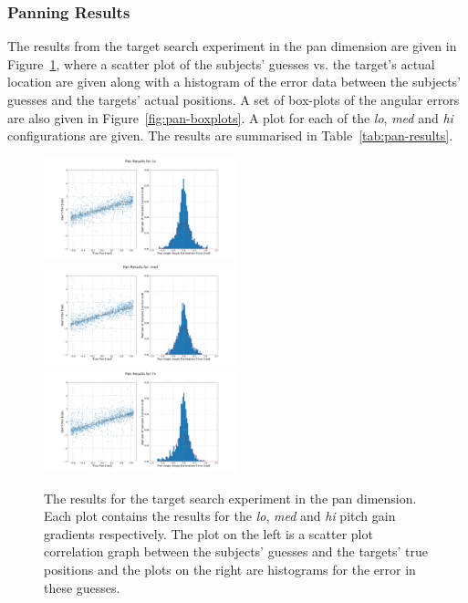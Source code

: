 \documentclass[format=sigconf, review=true, screen=true, anonymous=true]{acmart}
\begin{document}
\subsubsection{Panning Results}

The results from the target search experiment in the pan dimension are given in Figure~\ref{fig:pan-err}, where a scatter plot of the subjects' guesses vs. the target's actual location are given along with a histogram of the error data between the subjects' guesses and the targets' actual positions. A set of box-plots of the angular errors are also given in Figure~\ref{fig:pan-boxplots}. A plot for each of the \emph{lo}, \emph{med} and \emph{hi} configurations are given. The results are summarised in Table~\ref{tab:pan-results}.

\begin{figure}
  \centering
  \includegraphics[width=0.5\textwidth]{figures/pan_err_lo.png}
  \includegraphics[width=0.5\textwidth]{figures/pan_err_med.png}
  \includegraphics[width=0.5\textwidth]{figures/pan_err_hi.png}
  \caption{The results for the target search experiment in the pan dimension. Each plot contains the results for the \emph{lo}, \emph{med} and \emph{hi} pitch gain gradients respectively. The plot on the left is a scatter plot correlation graph between the subjects' guesses and the targets' true positions and the plots on the right are histograms for the error in these guesses. }
  \label{fig:pan-err}
\end{figure}
\end{document}
